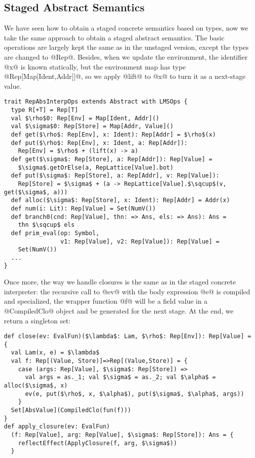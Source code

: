 \subsection{Staged Abstract Semantics} 
We have seen how to obtain a staged concrete semantics based on types, 
now we take the same approach to obtain a staged abstract semantics.
The basic operations are largely kept the same as in the unstaged version, except the types are changed to @Rep@.
Besides, when we update the environment, the identifier @x@ is known statically, but the environment map
has type @Rep[Map[Ident,Addr]]@, so we apply @lift@ to @x@ to turn it as a next-stage value.

\begin{lstlisting}
trait RepAbsInterpOps extends Abstract with LMSOps {
  type R[+T] = Rep[T]
  val $\rho$0: Rep[Env] = Map[Ident, Addr]()
  val $\sigma$0: Rep[Store] = Map[Addr, Value]()
  def get($\rho$: Rep[Env], x: Ident): Rep[Addr] = $\rho$(x)
  def put($\rho$: Rep[Env], x: Ident, a: Rep[Addr]): 
    Rep[Env] = $\rho$ + (lift(x) -> a)
  def get($\sigma$: Rep[Store], a: Rep[Addr]): Rep[Value] = 
    $\sigma$.getOrElse(a, RepLattice[Value].bot)
  def put($\sigma$: Rep[Store], a: Rep[Addr], v: Rep[Value]): 
    Rep[Store] = $\sigma$ + (a -> RepLattice[Value].$\sqcup$(v, get($\sigma$, a)))
  def alloc($\sigma$: Rep[Store], x: Ident): Rep[Addr] = Addr(x)
  def num(i: Lit): Rep[Value] = Set(NumV())
  def branch0(cnd: Rep[Value], thn: => Ans, els: => Ans): Ans =
    thn $\sqcup$ els
  def prim_eval(op: Symbol, 
                v1: Rep[Value], v2: Rep[Value]): Rep[Value] = 
    Set(NumV())
  ...
}
\end{lstlisting}

Once more, the way we handle closures is the same as in the staged concrete interpreter:
the recursive call to @ev@ with the body expression @e@ is compiled and specialized, 
the wrapper function @f@ will be a field value in a @CompiledClo@ object and be generated
for the next stage. At the end, we return a singleton set:

\begin{lstlisting}
def close(ev: EvalFun)($\lambda$: Lam, $\rho$: Rep[Env]): Rep[Value] = {
  val Lam(x, e) = $\lambda$
  val f: Rep[(Value, Store)]=>Rep[(Value,Store)] = {
    case (args: Rep[Value], $\sigma$: Rep[Store]) =>
      val args = as._1; val $\sigma$ = as._2; val $\alpha$ = alloc($\sigma$, x)
      ev(e, put($\rho$, x, $\alpha$), put($\sigma$, $\alpha$, args))
    }
  Set[AbsValue](CompiledClo(fun(f)))
}
def apply_closure(ev: EvalFun)
  (f: Rep[Value], arg: Rep[Value], $\sigma$: Rep[Store]): Ans = {
    reflectEffect(ApplyClosure(f, arg, $\sigma$))
  }
\end{lstlisting}


